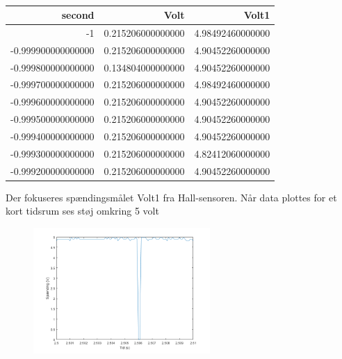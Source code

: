 \begin{table}[h]
  \centering
\begin{tabular}{r|r|r}
\hline
\textbf{second} & \textbf{Volt} & \textbf{Volt1} \\
\hline
-1 & 0.215206000000000 & 4.98492460000000 \\
-0.999900000000000 & 0.215206000000000 & 4.90452260000000 \\
-0.999800000000000 & 0.134804000000000 & 4.90452260000000 \\
-0.999700000000000 & 0.215206000000000 & 4.98492460000000 \\
-0.999600000000000 & 0.215206000000000 & 4.90452260000000 \\
-0.999500000000000 & 0.215206000000000 & 4.90452260000000 \\
-0.999400000000000 & 0.215206000000000 & 4.90452260000000 \\
-0.999300000000000 & 0.215206000000000 & 4.82412060000000 \\
-0.999200000000000 & 0.215206000000000 & 4.90452260000000 \\
\hline
\end{tabular}
  \caption{}
  \label{tab:komp3}
\end{table}

Der fokuseres spændingsmålet Volt1 fra Hall-sensoren.
Når data plottes for et kort tidsrum ses støj omkring 5 volt

\begin{figure}[h]
  \centering
  \includegraphics[width=0.6\textwidth]{mo1.png}
  \caption{}
  \label{fig:mo1}
\end{figure}

